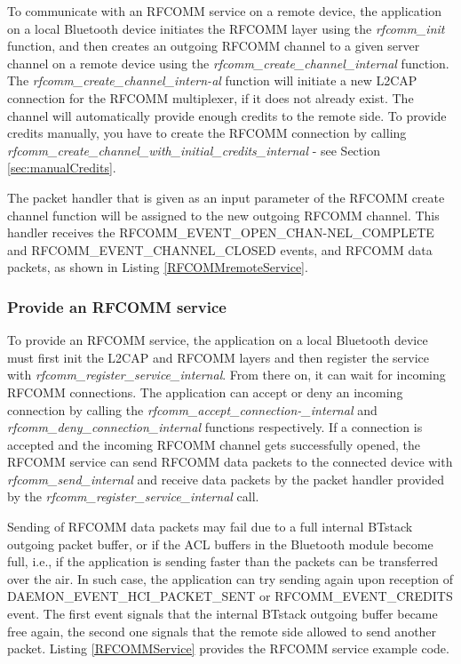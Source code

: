 To communicate with an RFCOMM service on a remote device, the application on a local Bluetooth device initiates the RFCOMM layer using the \emph{rfcomm\_init} function, and then creates an outgoing RFCOMM channel to a given server channel on a remote device using the \emph{rfcomm\_create\_channel\_internal} function. The  \emph{rfcomm\_create\_channel\_intern-al} function will initiate a new L2CAP connection for the RFCOMM multiplexer, if it does not already exist. The channel will automatically provide enough credits to the remote side. To provide credits manually, you have to create the RFCOMM connection by calling \emph{rfcomm\_create\_channel\_with\_initial\_credits\_internal} - see Section \ref{sec:manualCredits}.


The packet handler that is given as an input parameter of the RFCOMM create channel function will be assigned to the new outgoing \mbox{RFCOMM} channel. This handler receives the RFCOMM\_EVENT\_OPEN\_CHAN-NEL\_COMPLETE and RFCOMM\_EVENT\_CHANNEL\_CLOSED events, and RFCOMM data packets, as shown in Listing \ref{RFCOMMremoteService}.

\subsubsection{Provide an RFCOMM service}
\label{section:rfcomm_service}

To provide an RFCOMM service, the application on a local Bluetooth device must first init the L2CAP and RFCOMM layers and then register the service with \emph{rfcomm\_register\_service\_internal}. From there on, it can wait for incoming RFCOMM connections. The application can accept or deny an incoming connection by calling the \emph{rfcomm\_accept\_connection-\_internal} and \emph{rfcomm\_deny\_connection\_internal} functions respectively. If a connection is accepted and the incoming RFCOMM channel gets successfully opened, the RFCOMM service can send RFCOMM data packets to the connected device with \emph{rfcomm\_send\_internal} and receive data packets by the packet handler provided by the \emph{rfcomm\_register\_service\_internal} call.

Sending of RFCOMM data packets may fail due to a full internal BTstack outgoing packet buffer, or if the ACL buffers in the Bluetooth module become full, i.e., if the application is sending faster than the packets can be transferred over the air. In such case, the application can try sending again upon reception of DAEMON\_EVENT\_HCI\_PACKET\_SENT or RFCOMM\_EVENT\_CREDITS event. The first event signals that the internal BTstack outgoing buffer became free again, the second one signals that the remote side allowed to send another  packet. Listing \ref{RFCOMMService} provides the RFCOMM service example code.

